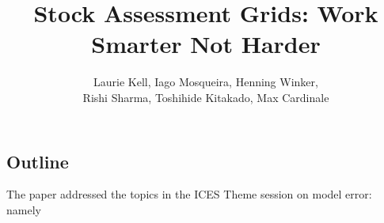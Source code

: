 \documentclass[a4paper]{article}
\title{Stock Assessment Grids: Work Smarter Not Harder}
\author{Laurie Kell, Iago Mosqueira, Henning Winker, \\Rishi Sharma, Toshihide  Kitakado, Max Cardinale}
\begin{document}
\maketitle

\begin{abstract}


\end{abstract}

\subsection*{Outline}

The paper addressed the topics in the ICES Theme session on model error: namely
\end{document}
